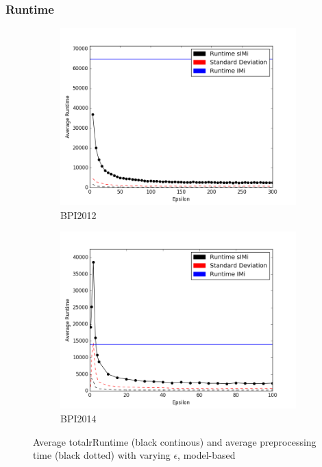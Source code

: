 \documentclass[
	a4paper,
	pagesize,
	pdftex,
	12pt,
	twoside, %
	BCOR=5mm, %
	ngerman,
	fleqn,
	final,
	]{scrartcl}
\begin{document}
\subsubsection{Runtime}
\begin{figure}[h]
	\begin{subfigure}{.5\textwidth}
	  \centering
	  \includegraphics[width=.9\linewidth]{data/BPI2012/BPI_2012_lax_threshold_time.png}
	  \caption{BPI2012}
	  \label{fig:runtime12}
	\end{subfigure}%
	\begin{subfigure}{.5\textwidth}
	  \centering
	  \includegraphics[width=.9\linewidth]{data/BPI2014/BPI2014_lax_threshold_timeAllData.png}
	  \caption{BPI2014}
	  \label{fig:runtime14}
	\end{subfigure}
	\caption{Average totalrRuntime (black continous) and average preprocessing time (black dotted) with varying $\epsilon$, model-based}
	\label{fig:runtime1214}
\end{figure}
\end{document}
